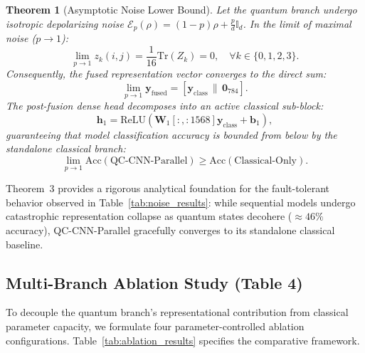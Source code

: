 \documentclass[journal]{IEEEtran}
\newtheorem{theorem}{Theorem}
\begin{document}
\begin{theorem}[Asymptotic Noise Lower Bound]
Let the quantum branch undergo isotropic depolarizing noise $\mathcal{E}_p(\rho) = (1-p)\rho + \frac{p}{d}\mathbb{I}_d$. In the limit of maximal noise ($p \to 1$):
\begin{equation}
\lim_{p \to 1} z_k(i, j) = \frac{1}{16} \mathrm{Tr}(Z_k) = 0, \quad \forall k \in \{0, 1, 2, 3\}.
\end{equation}
Consequently, the fused representation vector converges to the direct sum:
\begin{equation}
\lim_{p \to 1} \mathbf{y}_{\mathrm{fused}} = [\mathbf{y}_{\mathrm{class}} \,\|\, \mathbf{0}_{784}].
\label{eq:asymptotic_collapse}
\end{equation}
The post-fusion dense head decomposes into an active classical sub-block:
\begin{equation}
\mathbf{h}_1 = \mathrm{ReLU}\left( \mathbf{W}_1[:, :1568] \mathbf{y}_{\mathrm{class}} + \mathbf{b}_1 \right),
\end{equation}
guaranteeing that model classification accuracy is bounded from below by the standalone classical branch:
\begin{equation}
\lim_{p \to 1} \mathrm{Acc}(\text{QC-CNN-Parallel}) \ge \mathrm{Acc}(\text{Classical-Only}).
\label{eq:accuracy_lower_bound}
\end{equation}
\end{theorem}

Theorem~3 provides a rigorous analytical foundation for the fault-tolerant behavior observed in Table~\ref{tab:noise_results}: while sequential models undergo catastrophic representation collapse as quantum states decohere ($\approx 46\%$ accuracy), QC-CNN-Parallel gracefully converges to its standalone classical baseline.

\subsection{Multi-Branch Ablation Study (Table 4)}
To decouple the quantum branch's representational contribution from classical parameter capacity, we formulate four parameter-controlled ablation configurations. Table~\ref{tab:ablation_results} specifies the comparative framework.
\end{document}
